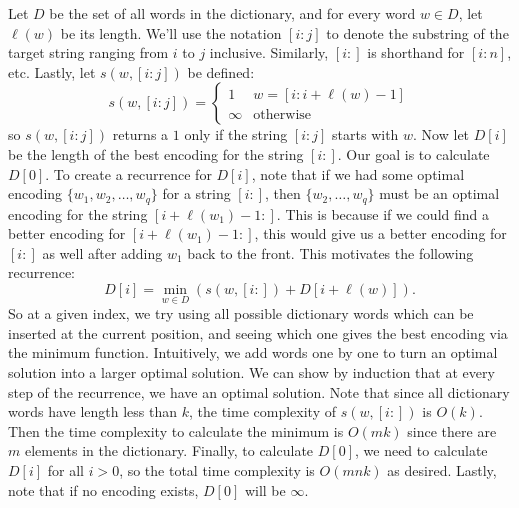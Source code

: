 \documentclass[11pt,letterpaper]{article}
\begin{document}
\begin{solution}
    Let $D$ be the set of all words in the dictionary, and for every word $w\in D$, let $\ell(w)$ be its length. We'll use the notation $[i:j]$ to denote the substring of the target string ranging from $i$ to $j$ inclusive. Similarly, $[i:]$ is shorthand for $[i:n]$, etc. Lastly, let $s(w, [i:j])$ be defined:
    \[
        s(w, [i:j]) = \begin{cases}
            1 & w = [i:i+\ell(w)-1]\\
            \infty & \mathrm{otherwise}
        \end{cases}
    \]
    so $s(w, [i:j])$ returns a $1$ only if the string $[i:j]$ starts with $w$. Now let $D[i]$ be the length of the best encoding for the string $[i:]$. Our goal is to calculate $D[0]$. To create a recurrence for $D[i]$, note that if we had some optimal encoding $\{w_1, w_2,\ldots, w_q\}$ for a string $[i:]$, then $\{w_2,\ldots,w_q\}$ must be an optimal encoding for the string $[i+\ell(w_1)-1:]$. This is because if we could find a better encoding for $[i+\ell(w_1)-1:]$, this would give us a better encoding for $[i:]$ as well after adding $w_1$ back to the front. This motivates the following recurrence:
    \[
        D[i]=\min_{w\in D}\left(s(w, [i:])+D[i+\ell(w)]\right)
    .\] 
    So at a given index, we try using all possible dictionary words which can be inserted at the current position, and seeing which one gives the best encoding via the minimum function. Intuitively, we add words one by one to turn an optimal solution into a larger optimal solution. We can show by induction that at every step of the recurrence, we have an optimal solution. Note that since all dictionary words have length less than $k$, the time complexity of $s(w, [i:])$ is $O(k)$. Then the time complexity to calculate the minimum is $O(mk)$ since there are $m$ elements in the dictionary. Finally, to calculate $D[0]$, we need to calculate $D[i]$ for all $i>0$, so the total time complexity is $O(mnk)$ as desired. Lastly, note that if no encoding exists, $D[0]$ will be $\infty$. 
\end{solution}
\end{document}
